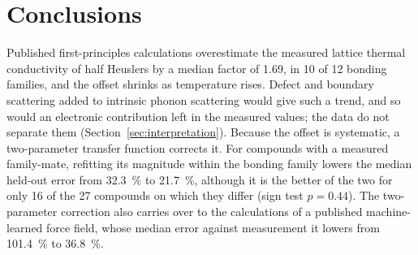 %
%

\section{Conclusions}
\label{sec:conclusions}

Published first-principles calculations overestimate the measured lattice thermal conductivity of
half Heuslers by a median factor of \num{1.69}, in \num{10} of \num{12} bonding families, and the
offset shrinks as temperature rises. Defect and boundary scattering added to intrinsic phonon
scattering would give such a trend, and so would an electronic contribution left in the measured
values; the data do not separate them (Section~\ref{sec:interpretation}). Because the offset is systematic,
a two-parameter transfer function corrects it. For compounds with a measured family-mate,
refitting its magnitude within the bonding family lowers the median held-out error from
\SI{32.3}{\percent} to \SI{21.7}{\percent}, although it is the better of the two for only
\num{16} of the \num{27} compounds on which they differ (sign test $p=\num{0.44}$). The
two-parameter correction also carries over to the
calculations of a published machine-learned force field, whose median error against measurement it
lowers from \SI{101.4}{\percent} to \SI{36.8}{\percent}.


